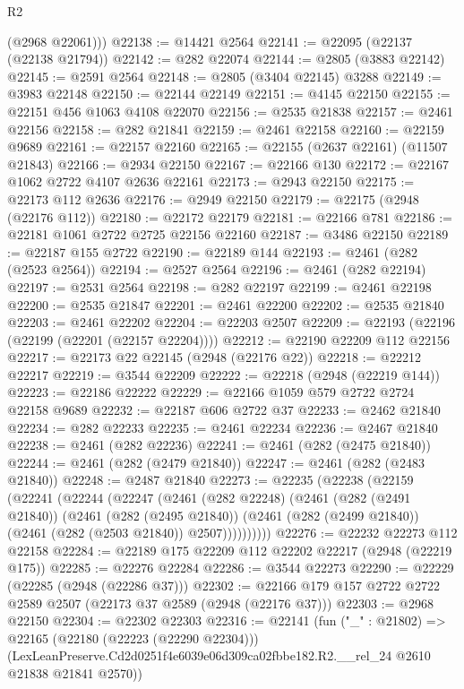 \begin{lexlean}{R2}
\begin{coremodule}
        (@2968 @22061)))
@22138 := @14421 @2564
@22141 := @22095 (@22137 (@22138 @21794))
@22142 := @282 @22074
@22144 := @2805 (@3883 @22142)
@22145 := @2591 @2564
@22148 := @2805 (@3404 @22145) @3288
@22149 := @3983 @22148
@22150 := @22144 @22149
@22151 := @4145 @22150
@22155 := @22151 @456 @1063 @4108 @22070
@22156 := @2535 @21838
@22157 := @2461 @22156
@22158 := @282 @21841
@22159 := @2461 @22158
@22160 := @22159 @9689
@22161 := @22157 @22160
@22165 := @22155 (@2637 @22161) (@11507 @21843)
@22166 := @2934 @22150
@22167 := @22166 @130
@22172 := @22167 @1062 @2722 @4107 @2636 @22161
@22173 := @2943 @22150
@22175 := @22173 @112 @2636
@22176 := @2949 @22150
@22179 := @22175 (@2948 (@22176 @112))
@22180 := @22172 @22179
@22181 := @22166 @781
@22186 := @22181 @1061 @2722 @2725 @22156 @22160
@22187 := @3486 @22150
@22189 := @22187 @155 @2722
@22190 := @22189 @144
@22193 := @2461 (@282 (@2523 @2564))
@22194 := @2527 @2564
@22196 := @2461 (@282 @22194)
@22197 := @2531 @2564
@22198 := @282 @22197
@22199 := @2461 @22198
@22200 := @2535 @21847
@22201 := @2461 @22200
@22202 := @2535 @21840
@22203 := @2461 @22202
@22204 := @22203 @2507
@22209 := @22193 (@22196 (@22199 (@22201 (@22157 @22204))))
@22212 := @22190 @22209 @112 @22156
@22217 := @22173 @22 @22145 (@2948 (@22176 @22))
@22218 := @22212 @22217
@22219 := @3544 @22209
@22222 := @22218 (@2948 (@22219 @144))
@22223 := @22186 @22222
@22229 := @22166 @1059 @579 @2722 @2724 @22158 @9689
@22232 := @22187 @606 @2722 @37
@22233 := @2462 @21840
@22234 := @282 @22233
@22235 := @2461 @22234
@22236 := @2467 @21840
@22238 := @2461 (@282 @22236)
@22241 := @2461 (@282 (@2475 @21840))
@22244 := @2461 (@282 (@2479 @21840))
@22247 := @2461 (@282 (@2483 @21840))
@22248 := @2487 @21840
@22273 := @22235
    (@22238
      (@22159
        (@22241
          (@22244
            (@22247
              (@2461
                (@282 @22248)
                (@2461
                  (@282 (@2491 @21840))
                  (@2461
                    (@282 (@2495 @21840))
                    (@2461 (@282 (@2499 @21840)) (@2461 (@282 (@2503 @21840)) @2507))))))))))
@22276 := @22232 @22273 @112 @22158
@22284 := @22189 @175 @22209 @112 @22202 @22217 (@2948 (@22219 @175))
@22285 := @22276 @22284
@22286 := @3544 @22273
@22290 := @22229 (@22285 (@2948 (@22286 @37)))
@22302 := @22166 @179 @157 @2722 @2722 @2589 @2507 (@22173 @37 @2589 (@2948 (@22176 @37)))
@22303 := @2968 @22150
@22304 := @22302 @22303
@22316 := @22141
    (fun ("_" : @21802) =>
    @22165
      (@22180 (@22223 (@22290 @22304)))
      (LexLeanPreserve.Cd2d0251f4e6039e06d309ca02fbbe182.R2.__rel_24 @2610 @21838 @21841 @2570))

\end{coremodule}
\end{lexlean}
